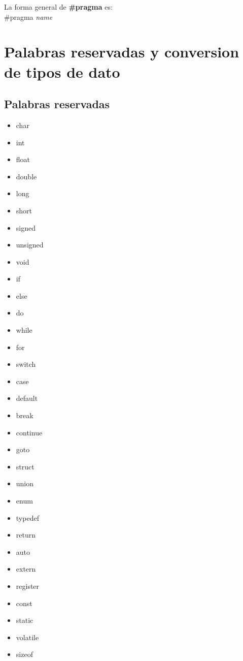 \documentclass[]{article}
\begin{document}
		La forma general de \textbf{\#pragma} es:\\
		
		\#pragma \textit{name}
			
			
		
	
	\section{Palabras reservadas y conversion de tipos de dato}
	
	\subsection{Palabras reservadas}
	
	\begin{multicols}{5}
		\begin{itemize}
			\item char
			\item int
			\item float
			\item double
			\item long
			\item short
			\item signed
			\item unsigned
			\item void
			\item if
			\item else
			\item do
			\item while
			\item for
			\item switch
			\item case
			\item default
			\item break
			\item continue
			\item goto
			\item struct
			\item union
			\item enum
			\item typedef
			\item return
			\item auto
			\item extern
			\item register
			\item const
			\item static
			\item volatile
			\item sizeof
		\end{itemize}
	\end{multicols}
	
\end{document}
